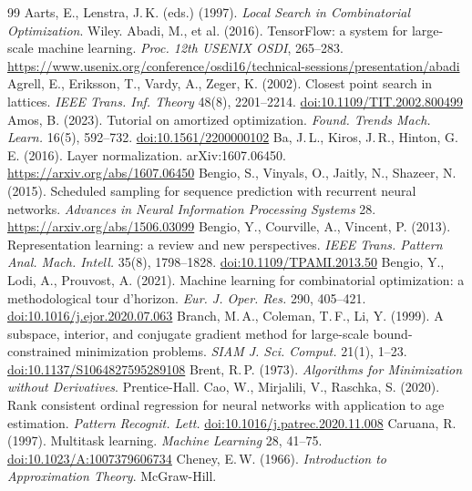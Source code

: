 \begin{thebibliography}{99}\small
{} Aarts, E., Lenstra, J.\,K. (eds.) (1997). \emph{Local Search in Combinatorial Optimization}. Wiley.
 Abadi, M., et al. (2016). TensorFlow: a system for large-scale machine learning. \emph{Proc. 12th USENIX OSDI}, 265--283. \url{https://www.usenix.org/conference/osdi16/technical-sessions/presentation/abadi}
 Agrell, E., Eriksson, T., Vardy, A., Zeger, K. (2002). Closest point search in lattices. \emph{IEEE Trans. Inf. Theory} 48(8), 2201--2214. \href{https://doi.org/10.1109/TIT.2002.800499}{doi:10.1109/TIT.2002.800499}
 Amos, B. (2023). Tutorial on amortized optimization. \emph{Found. Trends Mach. Learn.} 16(5), 592--732. \href{https://doi.org/10.1561/2200000102}{doi:10.1561/2200000102}
 Ba, J.\,L., Kiros, J.\,R., Hinton, G.\,E. (2016). Layer normalization. arXiv:1607.06450. \url{https://arxiv.org/abs/1607.06450}
 Bengio, S., Vinyals, O., Jaitly, N., Shazeer, N. (2015). Scheduled sampling for sequence prediction with recurrent neural networks. \emph{Advances in Neural Information Processing Systems} 28. \url{https://arxiv.org/abs/1506.03099}
 Bengio, Y., Courville, A., Vincent, P. (2013). Representation learning: a review and new perspectives. \emph{IEEE Trans. Pattern Anal. Mach. Intell.} 35(8), 1798--1828. \href{https://doi.org/10.1109/TPAMI.2013.50}{doi:10.1109/TPAMI.2013.50}
 Bengio, Y., Lodi, A., Prouvost, A. (2021). Machine learning for combinatorial optimization: a methodological tour d'horizon. \emph{Eur. J. Oper. Res.} 290, 405--421. \href{https://doi.org/10.1016/j.ejor.2020.07.063}{doi:10.1016/j.ejor.2020.07.063}
 Branch, M.\,A., Coleman, T.\,F., Li, Y. (1999). A subspace, interior, and conjugate gradient method for large-scale bound-constrained minimization problems. \emph{SIAM J. Sci. Comput.} 21(1), 1--23. \href{https://doi.org/10.1137/S1064827595289108}{doi:10.1137/S1064827595289108}
 Brent, R.\,P. (1973). \emph{Algorithms for Minimization without Derivatives}. Prentice-Hall.
 Cao, W., Mirjalili, V., Raschka, S. (2020). Rank consistent ordinal regression for neural networks with application to age estimation. \emph{Pattern Recognit. Lett.} \href{https://doi.org/10.1016/j.patrec.2020.11.008}{doi:10.1016/j.patrec.2020.11.008}
 Caruana, R. (1997). Multitask learning. \emph{Machine Learning} 28, 41--75. \href{https://doi.org/10.1023/A:1007379606734}{doi:10.1023/A:1007379606734}
 Cheney, E.\,W. (1966). \emph{Introduction to Approximation Theory}. McGraw-Hill.

\end{thebibliography}
